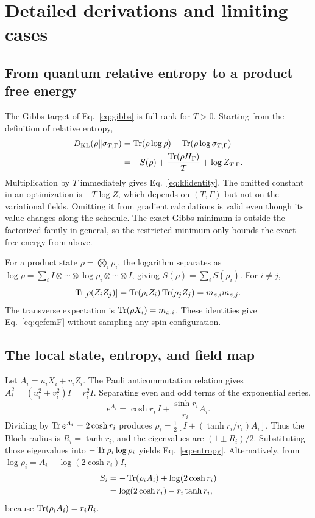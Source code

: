 \section{Detailed derivations and limiting cases}
\label{app:derivations}

\subsection{From quantum relative entropy to a product free energy}

The Gibbs target of Eq.~\eqref{eq:gibbs} is full rank for $T>0$. Starting
from the definition of relative entropy,
\begin{align}
 D_{\mathrm{KL}}(\rho\Vert\sigma_{T,\Gamma})
 &=\operatorname{Tr}(\rho\log\rho)-\operatorname{Tr}(\rho\log\sigma_{T,\Gamma})\nonumber\\
 &=-S(\rho)+\frac{\operatorname{Tr}(\rho H_\Gamma)}{T}
                 +\log Z_{T,\Gamma}.
 \label{eq:app-kl}
\end{align}
Multiplication by $T$ immediately gives Eq.~\eqref{eq:klidentity}.
The omitted constant in an optimization is $-T\log Z$, which depends
on $(T,\Gamma)$ but not on the variational fields. Omitting it from
gradient calculations is valid even though its value changes along the
schedule. The exact Gibbs minimum is outside the factorized family in
general, so the restricted minimum only bounds the exact free energy
from above.

For a product state $\rho=\bigotimes_i\rho_i$, the logarithm separates
as $\log\rho=\sum_i I\otimes\cdots\otimes\log\rho_i\otimes\cdots\otimes I$,
giving $S(\rho)=\sum_iS(\rho_i)$. For $i\ne j$,
\begin{equation}
 \operatorname{Tr}[\rho(Z_iZ_j)]
 =\operatorname{Tr}(\rho_iZ_i)\operatorname{Tr}(\rho_jZ_j)=m_{z,i}m_{z,j}.
 \label{eq:app-factor}
\end{equation}
The transverse expectation is $\operatorname{Tr}(\rho X_i)=m_{x,i}$. These identities
give Eq.~\eqref{eq:qefemF} without sampling any spin configuration.

\subsection{The local state, entropy, and field map}

Let $A_i=u_iX_i+v_iZ_i$. The Pauli anticommutation relation gives
$A_i^2=(u_i^2+v_i^2)I=r_i^2I$. Separating even and odd terms of the
exponential series,
\begin{equation}
 e^{A_i}=\cosh r_i\,I+
           \frac{\sinh r_i}{r_i}A_i.
 \label{eq:app-exp}
\end{equation}
Dividing by $\operatorname{Tr} e^{A_i}=2\cosh r_i$ produces
$\rho_i=\tfrac12[I+(\tanh r_i/r_i)A_i]$. Thus the Bloch radius is
$R_i=\tanh r_i$, and the eigenvalues are $(1\pm R_i)/2$.
Substituting those eigenvalues into $-\operatorname{Tr}\rho_i\log\rho_i$ yields
Eq.~\eqref{eq:entropy}. Alternatively, from
$\log\rho_i=A_i-\log(2\cosh r_i)I$,
\begin{align}
 S_i&=-\operatorname{Tr}(\rho_i A_i)+\log(2\cosh r_i)\nonumber\\
    &=\log(2\cosh r_i)-r_i\tanh r_i,
 \label{eq:app-entropy}
\end{align}
because $\operatorname{Tr}(\rho_i A_i)=r_iR_i$.

